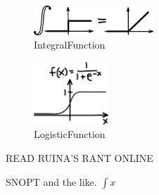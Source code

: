 \begin{figure}[h]		%
\begin{centering}
\includegraphics[width=0.4\textwidth]{Figures/IntegralFunction}\par
\end{centering}
\caption{IntegralFunction}
\label{fig:IntegralFunction}
\end{figure}
%

\begin{figure}[h]		%
\begin{centering}
\includegraphics[width=0.25\textwidth]{Figures/LogisticFunction}\par
\end{centering}
\caption{LogisticFunction}
\label{fig:LogisticFunction}
\end{figure}
%

READ RUINA'S RANT ONLINE

SNOPT and the like. $\int{x}$
